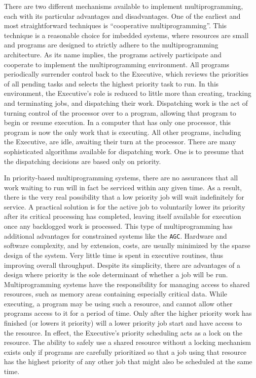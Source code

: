 \documentclass[refcap, oxford]{ahsan}
\begin{document}
There are two different mechanisms available to implement multiprogramming, each with its particular advantages and disadvantages. One of the earliest and most straightforward techniques is ``cooperative multiprogramming''. This technique is a reasonable choice for imbedded systems, where resources are small and programs are designed to strictly adhere to the multiprogramming architecture. As its name implies, the programs actively participate and cooperate to implement the multiprogramming environment. All programs periodically surrender control back to the Executive, which reviews the priorities of all pending tasks and selects the highest priority task to run. In this environment, the Executive's role is reduced to little more than creating, tracking and terminating jobs, and dispatching their work. Dispatching work is the act of turning control of the processor over to a program, allowing that program to begin or resume execution. In a computer that has only one processor, this program is now the only work that is executing. All other programs, including the Executive, are idle, awaiting their turn at the processor. There are many sophisticated algorithms available for dispatching work. One is to presume that the dispatching decisions are based only on priority.

In priority-based multiprogramming systems, there are no assurances that all work waiting to run will in fact be serviced within any given time. As a result, there is the very real possibility that a low priority job will wait indefinitely for service. A practical solution is for the active job to voluntarily lower its priority after its critical processing has completed, leaving itself available for execution once any backlogged work is processed. This type of multiprogramming has additional advantages for constrained systems like the \texttt{AGC}. Hardware and software complexity, and by extension, costs, are usually minimized by the sparse design of the system. Very little time is spent in executive routines, thus improving overall throughput. Despite its simplicity, there are advantages of a design where priority is the sole determinant of whether a job will be run. Multiprogramming systems have the responsibility for managing access to shared resources, such as memory areas containing especially critical data. While executing, a program may be using such a resource, and cannot allow other programs access to it for a period of time. Only after the higher priority work has finished (or lowers it priority) will a lower priority job start and have access to the resource. In effect, the Executive's priority scheduling acts as a lock on the resource. The ability to safely use a shared resource without a locking mechanism exists only if programs are carefully prioritized so that a job using that resource has the highest priority of any other job that might also be scheduled at the same time.
\end{document}
